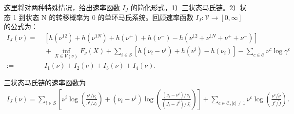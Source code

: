 这里将对两种特殊情况，给出速率函数 $I_J$ 的简化形式，1）三状态马氏链。2）状态 1 到状态 N 的转移概率为 0 的单环马氏系统。回顾速率函数 $I_J:\mathcal{V}\to[0,\infty]$ 的公式为：
\begin{equation*}\label{ratefunction1}
	\begin{split}
		I_J(\nu) =&\; \left[h\left(\nu^{12}\right)+h\left(\nu^{1N}\right)
		+h\left(\nu^+\right)+h\left(\nu^-\right)-h\left(\nu^{12}+\nu^{1N}+\nu^++\nu^-\right)\right] \\
		&\;+\inf_{X\in V(\nu)}F_{\nu}(X)+\sum_{i\in S}\left[ h\left(\nu_i-\nu^i\right)+h\left(\nu^i\right)
		-h\left(\nu_i\right)\right]-\sum_{c\in\mathcal{C}}\nu^c\log\gamma^c\\
		:=&\;I_1(\nu)+I_2(\nu)+I_3(\nu)+I_4(\nu).
	\end{split}
\end{equation*}
\begin{proposition}
三状态马氏链的速率函数为
\begin{align*}
I_J(\nu) =
\sum_{i\in S} \left[\nu^{i}\log \left(\frac{\nu^{i}/\nu_i}{J^i/J_i}\right) + (\nu_i - \nu^i)\log \left(\frac{(\nu_i - \nu^i)/\nu_i}{(J_i - J^i)/J_i} \right)
\right]
+ \sum_{c \in \mathcal{C}, |c|\neq 1} \nu^{c} \log \left(\frac{\nu^{c}/\tilde{\nu}}{J^c/\tilde{J}}\right).
\end{align*}
\end{proposition}
